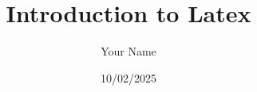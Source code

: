 \documentclass{article}
\begin{document}
\title{Introduction to Latex}
\author{ Your Name}
\date{10/02/2025}
\maketitle
\end{document}
